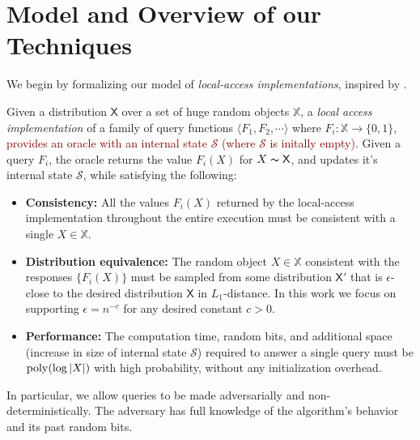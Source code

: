\section{Model and Overview of our Techniques}
\label{sec:overview_of_our_techniques}
We begin by formalizing our model of \emph{local-access implementations}, inspired by \cite{reut}.

\begin{definition}
\label{def:local_access}
Given a distribution $\mathsf  X$ over a set of huge random objects $\mathbb X$, a \emph{local access implementation}
of a family of query functions $\langle F_1, F_2,\cdots \rangle$ where $F_i: \mathbb X\rightarrow \{0,1\}$,
\textcolor{Maroon}{provides an oracle with an internal state $\mathcal S$ (where $\mathcal S$ is initally empty)}.
Given a query $F_i$, the oracle returns the value $F_i(X)$ for $X\thicksim \mathsf X$, and updates it's internal state $\mathcal S$,
while satisfying the following:
\begin{itemize}
    \item \textbf{Consistency:}
    All the values $F_i(X)$ returned by the local-access implementation throughout the entire execution
    must be consistent with a single $X\in \mathbb X$.
    \item \textbf{Distribution equivalence:}
    The random object $X\in \mathbb X$ consistent with the responses $\{ F_i(X)\}$ must be sampled from some distribution $\mathsf{X}'$
    that is $\epsilon$-close to the desired distribution $\mathsf{X}$ in $L_1$-distance.
    In this work we focus on supporting $\epsilon = n^{-c}$ for any desired constant $c>0$.
    \item \textbf{Performance:}
    The computation time, random bits, and additional space (increase in size of internal state $\mathcal S$)
    required to answer a single query must be $\mathrm{poly}(\log |X|)$ with high probability, without any initialization overhead.
\end{itemize}
\end{definition}

In particular, we allow queries to be made adversarially and non-deterministically.
The adversary has full knowledge of the algorithm's behavior and its past random bits.


